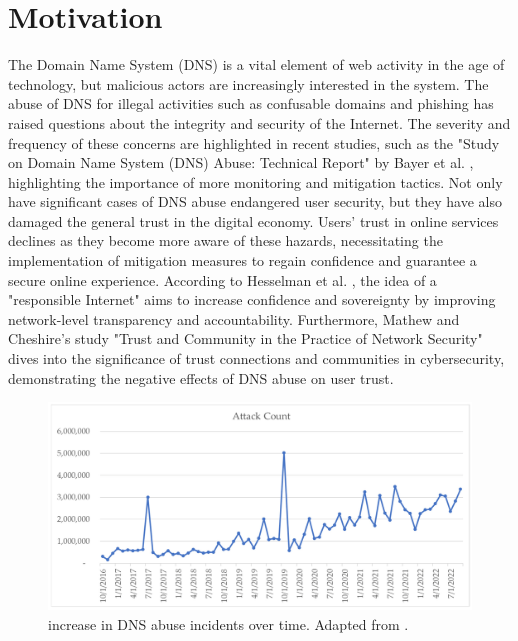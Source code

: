 \section{Motivation}

The Domain Name System (DNS) is a vital element of web activity in the age of technology, but malicious actors are increasingly interested in the system. The abuse of DNS for illegal activities such as confusable domains and phishing has raised questions about the integrity and security of the Internet. The severity and frequency of these concerns are highlighted in recent studies, such as the "Study on Domain Name System (DNS) Abuse: Technical Report" by Bayer et al. \cite{bayer2022}, highlighting the importance of more monitoring and mitigation tactics. Not only have significant cases of DNS abuse endangered user security, but they have also damaged the general trust in the digital economy. Users' trust in online services declines as they become more aware of these hazards, necessitating the implementation of mitigation measures to regain confidence and guarantee a secure online experience. According to Hesselman et al. \cite{hesselman2020}, the idea of a "responsible Internet" aims to increase confidence and sovereignty by improving network-level transparency and accountability. Furthermore, Mathew and Cheshire's \cite{mathew2016} study "Trust and Community in the Practice of Network Security" dives into the significance of trust connections and communities in cybersecurity, demonstrating the negative effects of DNS abuse on user trust.

\begin{figure}[H]
    \centering
    \includegraphics[width=0.9\linewidth]{introduction/maliciousActivity.png}
    \caption{ increase in DNS abuse incidents over time. Adapted from \cite{Rich2023Cyberpsychology}.}
    \label{fig:dnsintro2}
\end{figure}

